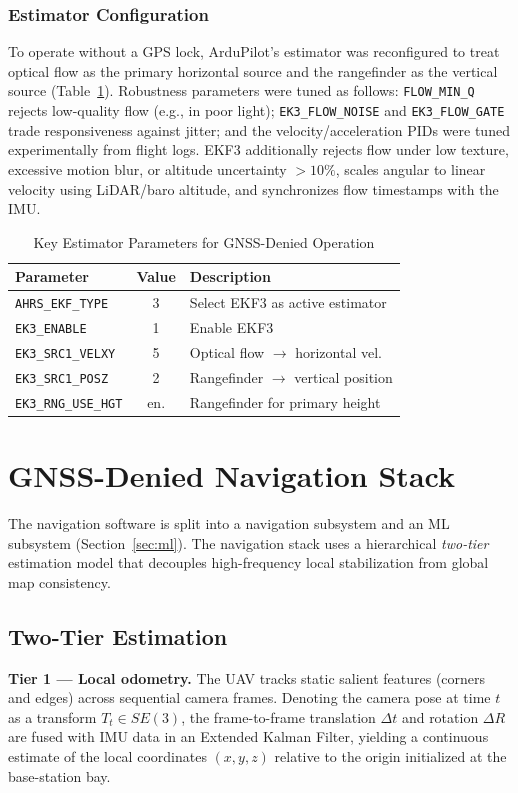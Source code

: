 \documentclass[journal]{IEEEtran}
\begin{document}
\subsubsection{Estimator Configuration}
To operate without a GPS lock, ArduPilot's estimator was reconfigured to
treat optical flow as the primary horizontal source and the rangefinder as
the vertical source (Table~\ref{tab:ekf}). Robustness parameters were tuned
as follows: \texttt{FLOW\_MIN\_Q} rejects low-quality flow (e.g., in poor
light); \texttt{EK3\_FLOW\_NOISE} and \texttt{EK3\_FLOW\_GATE} trade
responsiveness against jitter; and the velocity/acceleration PIDs were tuned
experimentally from flight logs. EKF3 additionally rejects flow under low
texture, excessive motion blur, or altitude uncertainty $>10\%$, scales
angular to linear velocity using LiDAR/baro altitude, and synchronizes flow
timestamps with the IMU.

\begin{table}[!t]
\centering
\caption{Key Estimator Parameters for GNSS-Denied Operation}
\label{tab:ekf}
\begin{tabular}{lcl}
\toprule
Parameter & Value & Description\\
\midrule
\texttt{AHRS\_EKF\_TYPE} & 3 & Select EKF3 as active estimator\\
\texttt{EK3\_ENABLE} & 1 & Enable EKF3\\
\texttt{EK3\_SRC1\_VELXY} & 5 & Optical flow $\rightarrow$ horizontal vel.\\
\texttt{EK3\_SRC1\_POSZ} & 2 & Rangefinder $\rightarrow$ vertical position\\
\texttt{EK3\_RNG\_USE\_HGT} & en. & Rangefinder for primary height\\
\bottomrule
\end{tabular}
\end{table}

\section{GNSS-Denied Navigation Stack}
\label{sec:nav}
The navigation software is split into a navigation subsystem and an ML
subsystem (Section~\ref{sec:ml}). The navigation stack uses a hierarchical
\emph{two-tier} estimation model that decouples high-frequency local
stabilization from global map consistency.

\subsection{Two-Tier Estimation}
\textbf{Tier 1 --- Local odometry.} The UAV tracks static salient features
(corners and edges) across sequential camera frames. Denoting the camera
pose at time $t$ as a transform $T_t \in SE(3)$, the frame-to-frame
translation $\Delta t$ and rotation $\Delta R$ are fused with IMU data in an
Extended Kalman Filter, yielding a continuous estimate of the local
coordinates $(x,y,z)$ relative to the origin initialized at the
base-station bay.
\end{document}
